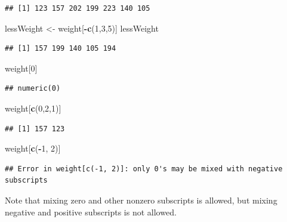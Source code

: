 \documentclass[
]{krantz}
\newenvironment{Shaded}{\begin{snugshade}}{\end{snugshade}}
\newcommand{\DecValTok}[1]{\textcolor[rgb]{0.00,0.00,0.81}{#1}}
\newcommand{\KeywordTok}[1]{\textcolor[rgb]{0.13,0.29,0.53}{\textbf{#1}}}
\newcommand{\NormalTok}[1]{#1}
\newcommand{\OperatorTok}[1]{\textcolor[rgb]{0.81,0.36,0.00}{\textbf{#1}}}
\newcommand{\StringTok}[1]{\textcolor[rgb]{0.31,0.60,0.02}{#1}}
\begin{document}
\begin{verbatim}
## [1] 123 157 202 199 223 140 105
\end{verbatim}

\begin{Shaded}
\begin{Highlighting}[]
\NormalTok{lessWeight \textless{}{-}}\StringTok{ }\NormalTok{weight[}\OperatorTok{{-}}\KeywordTok{c}\NormalTok{(}\DecValTok{1}\NormalTok{,}\DecValTok{3}\NormalTok{,}\DecValTok{5}\NormalTok{)]}
\NormalTok{lessWeight}
\end{Highlighting}
\end{Shaded}

\begin{verbatim}
## [1] 157 199 140 105 194
\end{verbatim}

\begin{Shaded}
\begin{Highlighting}[]
\NormalTok{weight[}\DecValTok{0}\NormalTok{]}
\end{Highlighting}
\end{Shaded}

\begin{verbatim}
## numeric(0)
\end{verbatim}

\begin{Shaded}
\begin{Highlighting}[]
\NormalTok{weight[}\KeywordTok{c}\NormalTok{(}\DecValTok{0}\NormalTok{,}\DecValTok{2}\NormalTok{,}\DecValTok{1}\NormalTok{)]}
\end{Highlighting}
\end{Shaded}

\begin{verbatim}
## [1] 157 123
\end{verbatim}

\begin{Shaded}
\begin{Highlighting}[]
\NormalTok{weight[}\KeywordTok{c}\NormalTok{(}\OperatorTok{{-}}\DecValTok{1}\NormalTok{, }\DecValTok{2}\NormalTok{)]}
\end{Highlighting}
\end{Shaded}

\begin{verbatim}
## Error in weight[c(-1, 2)]: only 0's may be mixed with negative subscripts
\end{verbatim}

Note that mixing zero and other nonzero subscripts is allowed, but mixing negative and positive subscripts is not allowed.
\end{document}
